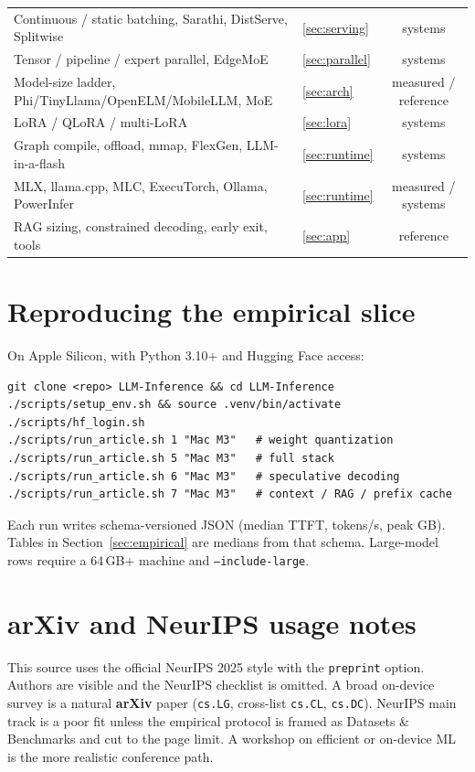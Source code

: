 \begin{table}[t]
\begin{tabular}{@{}llc@{}}
    Continuous / static batching, Sarathi, DistServe, Splitwise & \ref{sec:serving} & systems \\
    Tensor / pipeline / expert parallel, EdgeMoE & \ref{sec:parallel} & systems \\
    Model-size ladder, Phi/TinyLlama/OpenELM/MobileLLM, MoE & \ref{sec:arch} & measured / reference \\
    LoRA / QLoRA / multi-LoRA & \ref{sec:lora} & systems \\
    Graph compile, offload, mmap, FlexGen, LLM-in-a-flash & \ref{sec:runtime} & systems \\
    MLX, llama.cpp, MLC, ExecuTorch, Ollama, PowerInfer & \ref{sec:runtime} & measured / systems \\
    RAG sizing, constrained decoding, early exit, tools & \ref{sec:app} & reference \\
    \bottomrule
  \end{tabular}
\end{table}

\section{Reproducing the empirical slice}
\label{app:repro}

On Apple Silicon, with Python 3.10+ and Hugging Face access:
\begin{verbatim}
git clone <repo> LLM-Inference && cd LLM-Inference
./scripts/setup_env.sh && source .venv/bin/activate
./scripts/hf_login.sh
./scripts/run_article.sh 1 "Mac M3"   # weight quantization
./scripts/run_article.sh 5 "Mac M3"   # full stack
./scripts/run_article.sh 6 "Mac M3"   # speculative decoding
./scripts/run_article.sh 7 "Mac M3"   # context / RAG / prefix cache
\end{verbatim}
Each run writes schema-versioned JSON (median TTFT, tokens/s, peak GB). Tables in Section~\ref{sec:empirical} are medians from that schema. Large-model rows require a 64\,GB+ machine and \texttt{--include-large}.

\section{arXiv and NeurIPS usage notes}
\label{app:arxiv}

This source uses the official NeurIPS 2025 style with the \texttt{preprint} option. Authors are visible and the NeurIPS checklist is omitted. A broad on-device survey is a natural \textbf{arXiv} paper (\texttt{cs.LG}, cross-list \texttt{cs.CL}, \texttt{cs.DC}). NeurIPS main track is a poor fit unless the empirical protocol is framed as Datasets \& Benchmarks and cut to the page limit. A workshop on efficient or on-device ML is the more realistic conference path.
